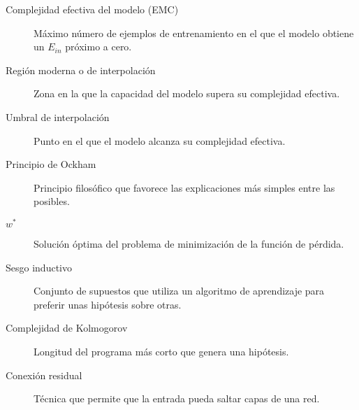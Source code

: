 \begin{description}
  \item[Complejidad efectiva del modelo (EMC)] Máximo número de ejemplos de entrenamiento en el que el modelo obtiene un $E_{in}$ próximo a cero.
  \item[Región moderna o de interpolación] Zona en la que la capacidad del modelo supera su complejidad efectiva.
  \item[Umbral de interpolación] Punto en el que el modelo alcanza su complejidad efectiva.
  \item[Principio de Ockham] Principio filosófico que favorece las explicaciones más simples entre las posibles.
  \item[$w^{*}$] Solución óptima del problema de minimización de la función de pérdida.
  \item[Sesgo inductivo] Conjunto de supuestos que utiliza un algoritmo de aprendizaje para preferir unas hipótesis sobre otras.
  \item[Complejidad de Kolmogorov] Longitud del programa más corto que genera una hipótesis.
  \item[Conexión residual] Técnica que permite que la entrada pueda saltar capas de una red.
\end{description}

\endinput
